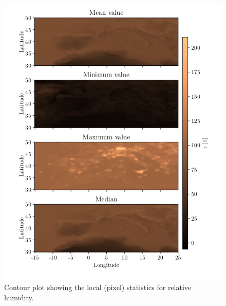 \begin{figure}[ht]
    \centering
    \includegraphics{python_figs/all_stat_variable_r.png}
    \caption{Contour plot showing the local (pixel) statistics for relative humidity.}
    \label{fig:all_stats_r}
\end{figure}
